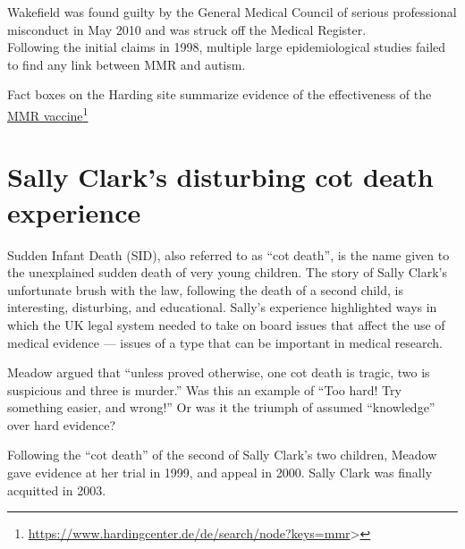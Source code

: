 \documentclass[
  10pt,
  b5paper]{book}
\begin{document}
Wakefield was found guilty by the General Medical Council of serious professional misconduct in May 2010 and was struck off the Medical Register.\\
Following the initial claims in 1998, multiple large epidemiological studies failed to find any link between MMR and autism.

Fact boxes on the Harding site summarize evidence of the
effectiveness of the \href{https://www.hardingcenter.de/de/search/node?keys=mmr}{MMR vaccine}\footnote{\url{https://www.hardingcenter.de/de/search/node?keys=mmr}\textgreater{}}

\hypertarget{sally-clarks-disturbing-cot-death-experience}{%
\section{Sally Clark's disturbing cot death experience}\label{sally-clarks-disturbing-cot-death-experience}}

Sudden Infant Death (SID), also referred to as ``cot death'',
is the name given to the unexplained sudden death of very
young children. The story of Sally Clark's unfortunate brush
with the law, following the death of a second child, is
interesting, disturbing, and educational. Sally's experience
highlighted ways in which the UK legal system needed to take
on board issues that affect the use of medical evidence ---
issues of a type that can be important in medical research.

Meadow argued that ``unless proved otherwise, one cot death is tragic,
two is suspicious and three is murder.''
Was this an example of ``Too hard! Try something easier, and wrong!''
Or was it the triumph of assumed ``knowledge'' over hard evidence?

Following the ``cot death'' of the second of Sally Clark's two children,
Meadow gave evidence at her trial in 1999, and appeal
in 2000. Sally Clark was finally acquitted in 2003.
\end{document}
